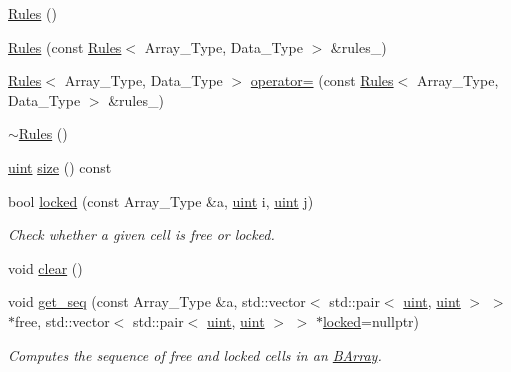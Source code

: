 \begin{DoxyCompactItemize}
\item 
\hyperlink{classbarry_1_1_rules_ac9468cdfab55a3be6675ad1fddae2bc0}{Rules} ()
\item 
\hyperlink{classbarry_1_1_rules_a57f5ab44febba391b2a06d163d25b237}{Rules} (const \hyperlink{classbarry_1_1_rules}{Rules}$<$ Array\+\_\+\+Type, Data\+\_\+\+Type $>$ \&rules\+\_\+)
\item 
\hyperlink{classbarry_1_1_rules}{Rules}$<$ Array\+\_\+\+Type, Data\+\_\+\+Type $>$ \hyperlink{classbarry_1_1_rules_ab87544febb8301772164570708bd708e}{operator=} (const \hyperlink{classbarry_1_1_rules}{Rules}$<$ Array\+\_\+\+Type, Data\+\_\+\+Type $>$ \&rules\+\_\+)
\item 
\hyperlink{classbarry_1_1_rules_a287ba2cf76f83ad982c05383b5726946}{$\sim$\+Rules} ()
\item 
\hyperlink{namespacebarry_a11dfc53ddb4672278319aa04f1e09a6c}{uint} \hyperlink{classbarry_1_1_rules_a590fd2603dd686e91e33330529ab8e77}{size} () const
\item 
bool \hyperlink{classbarry_1_1_rules_a51540e67c97559216cf84f8a7e230ea7}{locked} (const Array\+\_\+\+Type \&a, \hyperlink{namespacebarry_a11dfc53ddb4672278319aa04f1e09a6c}{uint} i, \hyperlink{namespacebarry_a11dfc53ddb4672278319aa04f1e09a6c}{uint} j)
\begin{DoxyCompactList}\small\item\em Check whether a given cell is free or locked. \end{DoxyCompactList}\item 
void \hyperlink{classbarry_1_1_rules_a135a15d3ff70d4350d76a15f8e85f7df}{clear} ()
\item 
void \hyperlink{classbarry_1_1_rules_afc2e6ddd9cf384f9e70896ad6e581ed4}{get\+\_\+seq} (const Array\+\_\+\+Type \&a, std\+::vector$<$ std\+::pair$<$ \hyperlink{namespacebarry_a11dfc53ddb4672278319aa04f1e09a6c}{uint}, \hyperlink{namespacebarry_a11dfc53ddb4672278319aa04f1e09a6c}{uint} $>$ $>$ $\ast$free, std\+::vector$<$ std\+::pair$<$ \hyperlink{namespacebarry_a11dfc53ddb4672278319aa04f1e09a6c}{uint}, \hyperlink{namespacebarry_a11dfc53ddb4672278319aa04f1e09a6c}{uint} $>$ $>$ $\ast$\hyperlink{classbarry_1_1_rules_a51540e67c97559216cf84f8a7e230ea7}{locked}=nullptr)
\begin{DoxyCompactList}\small\item\em Computes the sequence of free and locked cells in an \hyperlink{classbarry_1_1_b_array}{B\+Array}. \end{DoxyCompactList}\end{DoxyCompactItemize}
